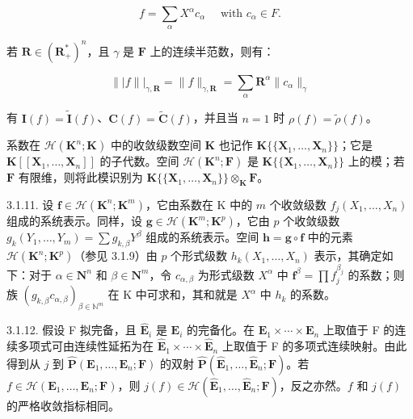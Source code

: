 \[
f = \sum_ {\alpha} X ^ {\alpha} c _ {\alpha} \quad \text {   with   } c _ {\alpha} \in F.
\]

若 \(\mathbf{R} \in (\mathbf{R}_{+}^{*})^{n}\)，且 \(\gamma\) 是 \(\mathbf{F}\) 上的连续半范数，则有：

\[
\| | f \| | _ {\gamma , \mathbf {R}} = \| f \| _ {\gamma , \mathbf {R}} = \sum_ {\alpha} \mathbf {R} ^ {\alpha} \| c _ {\alpha} \| _ {\gamma}
\]

有 \(\mathbf{I}(f) = \tilde{\mathbf{I}}(f)\)、\(\mathbf{C}(f) = \tilde{\mathbf{C}}(f)\)，并且当 \(n = 1\) 时 \(\rho(f) = \tilde{\rho}(f)\)。

系数在 \(\mathcal{H}(\mathbf{K}^{n};\mathbf{K})\) 中的收敛级数空间 \(\mathbf{K}\) 也记作 \(\mathbf{K}\{\{\mathbf{X}_{1},\ldots ,\mathbf{X}_{n}\}\}\)；它是 \(\mathbf{K}[[\mathbf{X}_1,\dots ,\mathbf{X}_n]]\) 的子代数。空间 \(\mathcal{H}(\mathbf{K}^n;\mathbf{F})\) 是 \(\mathbf{K}\{\{\mathbf{X}_1,\ldots ,\mathbf{X}_n\}\}\) 上的模；若 \(\mathbf{F}\) 有限维，则将此模识别为 \(\mathbf{K}\{\{\mathbf{X}_1,\ldots ,\mathbf{X}_n\}\} \otimes_{\mathbf{K}}\mathbf{F}\)。

3.1.11. 设 \(\mathbf{f} \in \mathcal{H}(\mathbf{K}^n; \mathbf{K}^m)\)，它由系数在 K 中的 \(m\) 个收敛级数 \(f_j(X_1, \ldots, X_n)\) 组成的系统表示。同样，设 \(\mathbf{g} \in \mathcal{H}(\mathbf{K}^m; \mathbf{K}^p)\)，它由 \(p\) 个收敛级数 \(g_k(Y_1, \ldots, Y_m) = \sum g_{k,\beta} Y^\beta\) 组成的系统表示。空间 \(\mathbf{h} = \mathbf{g} \circ \mathbf{f}\) 中的元素 \(\mathcal{H}(\mathbf{K}^n; \mathbf{K}^p)\)（参见 3.1.9）由 \(p\) 个形式级数 \(h_k(X_1, \ldots, X_n)\) 表示，其确定如下：对于 \(\alpha \in \mathbf{N}^n\) 和 \(\beta \in \mathbf{N}^m\)，令 \(c_{\alpha,\beta}\) 为形式级数 \(X^\alpha\) 中 \(\mathbf{f}^\beta = \prod f_j^{\beta_j}\) 的系数；则族 \((g_{k,\beta} c_{\alpha,\beta})_{\beta \in \mathbb{N}^m}\) 在 K 中可求和，其和就是 \(X^\alpha\) 中 \(h_k\) 的系数。

3.1.12. 假设 F 拟完备，且 \(\hat{\mathbf{E}}_{i}\) 是 \(\mathbf{E}_{i}\) 的完备化。在 \(\mathbf{E}_{1} \times \cdots \times \mathbf{E}_{n}\) 上取值于 F 的连续多项式可由连续性延拓为在 \(\hat{\mathbf{E}}_{1} \times \cdots \times \hat{\mathbf{E}}_{n}\) 上取值于 F 的多项式连续映射。由此得到从 \(j\) 到 \(\hat{\mathbf{P}}(\mathbf{E}_{1}, \ldots, \mathbf{E}_{n}; \mathbf{F})\) 的双射 \(\hat{\mathbf{P}}(\hat{\mathbf{E}}_{1}, \ldots, \hat{\mathbf{E}}_{n}; \mathbf{F})\)。若 \(f \in \mathcal{H}(\mathbf{E}_{1}, \ldots, \mathbf{E}_{n}; \mathbf{F})\)，则 \(j(f) \in \mathcal{H}(\hat{\mathbf{E}}_{1}, \ldots, \hat{\mathbf{E}}_{n}; \mathbf{F})\)，反之亦然。\(f\) 和 \(j(f)\) 的严格收敛指标相同。

